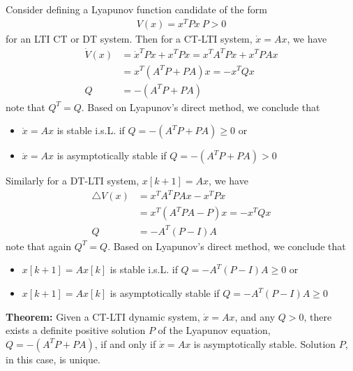 \documentclass[twoside]{article}
\begin{document}
Consider defining a Lyapunov function candidate of the form
%
\begin{align*}
V(x) = x^T P x  \ P > 0
\end{align*}
%
for an LTI CT or DT system. Then for a CT-LTI system, $\dot{x} = A x$, we have
%
\begin{align*}
\dot{V}(x) &= \dot{x}^T P x + x^T P x = x^T A^T P x + x^T P A x 
\\
&= x^T (A^T P + P A) x = - x^T Q x
\\
Q &= - (A^T P + P A)
\end{align*}
%
note that $Q^T = Q$. Based on Lyapunov's direct method, we conclude that
\begin{itemize}
\item $\dot{x} = A x$ is stable i.s.L. if $Q = -(A^T P + P A) \geq 0$ or 
%
\item $\dot{x} = A x$ is asymptotically stable if $Q = -(A^T P + P A) > 0$
\end{itemize}
%
Similarly for a DT-LTI system, $x[k+1] = A x$, we have
%
\begin{align*}
\triangle V(x) &= x^T A^T P A x - x^T P x 
\\
&= x^T (A^T P A - P) x = - x^T Q x
\\
Q &= - A^T ( P - I ) A
\end{align*}
%
note that again $Q^T = Q$. Based on Lyapunov's direct method, we conclude that
\begin{itemize}
\item $x[k+1] = A x[k]$ is stable i.s.L. if $Q = - A^T ( P - I ) A \geq 0$ or 
%
\item $x[k+1] = A x[k]$ is asymptotically stable if $Q = - A^T ( P - I ) A \geq 0$
\end{itemize}
%

\textbf{Theorem:} Given a CT-LTI dynamic system, $\dot{x} = A x$, and 
any $Q>0$, there exists a definite positive solution $P$ of the Lyapunov equation, $Q = - (A^T P + P A)$, if and only if $\dot{x} = A x$ is asymptotically stable. Solution $P$, in this case, is unique.
\end{document}
